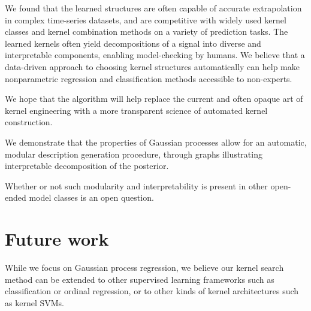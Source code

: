 We found that the learned structures are often capable of accurate extrapolation in complex time-series datasets, and are competitive with widely used kernel classes and kernel combination methods on a variety of prediction tasks.
The learned kernels often yield decompositions of a signal into diverse and interpretable components, enabling model-checking by humans.  %
We believe that a data-driven approach to choosing kernel structures automatically can help make nonparametric regression and classification methods accessible to non-experts.



We hope that the \procedurename{} algorithm will help replace the current and often opaque art of kernel engineering with a more transparent science of automated kernel construction.


We demonstrate that the properties of Gaussian processes allow for an automatic, modular description generation procedure, through graphs illustrating interpretable decomposition of the posterior.

Whether or not such modularity and interpretability is present in other open-ended model classes is an open question.



\section{Future work}

While we focus on Gaussian process regression, we believe our kernel search method can be extended to other supervised learning frameworks such as classification or ordinal regression, or to other kinds of kernel architectures such as kernel SVMs.





